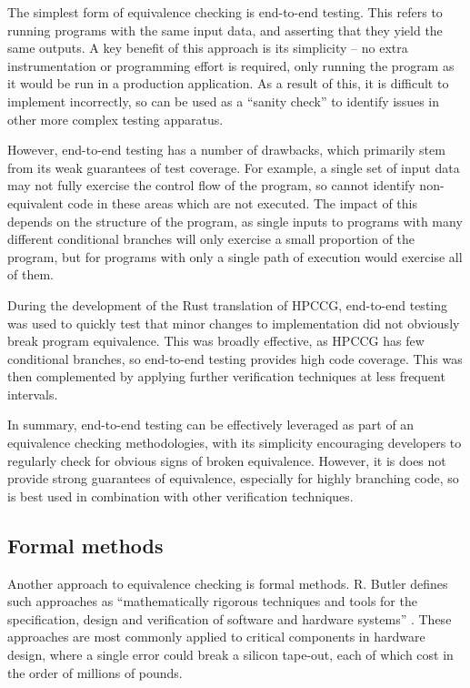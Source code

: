 The simplest form of equivalence checking is end-to-end testing. This refers to running programs with the same input data, and asserting that they yield the same outputs. A key benefit of this approach is its simplicity -- no extra instrumentation or programming effort is required, only running the program as it would be run in a production application. As a result of this, it is difficult to implement incorrectly, so can be used as a ``sanity check'' to identify issues in other more complex testing apparatus.

However, end-to-end testing has a number of drawbacks, which primarily stem from its weak guarantees of test coverage. For example, a single set of input data may not fully exercise the control flow of the program, so cannot identify non-equivalent code in these areas which are not executed. The impact of this depends on the structure of the program, as single inputs to programs with many different conditional branches will only exercise a small proportion of the program, but for programs with only a single path of execution would exercise all of them.

During the development of the Rust translation of HPCCG, end-to-end testing was used to quickly test that minor changes to implementation did not obviously break program equivalence. This was broadly effective, as HPCCG has few conditional branches, so end-to-end testing provides high code coverage. This was then complemented by applying further verification techniques at less frequent intervals.

In summary, end-to-end testing can be effectively leveraged as part of an equivalence checking methodologies, with its simplicity encouraging developers to regularly check for obvious signs of broken equivalence. However, it is does not provide strong guarantees of equivalence, especially for highly branching code, so is best used in combination with other verification techniques.

\subsection{Formal methods}
\label{ssec:equivalence-formal-methods}

Another approach to equivalence checking is formal methods. R. Butler defines such approaches as ``mathematically rigorous techniques and tools for the specification, design and verification of software and hardware systems'' \cite{LangleyFormalMethods}. These approaches are most commonly applied to critical components in hardware design, where a single error could break a silicon tape-out, each of which cost in the order of millions of pounds.

